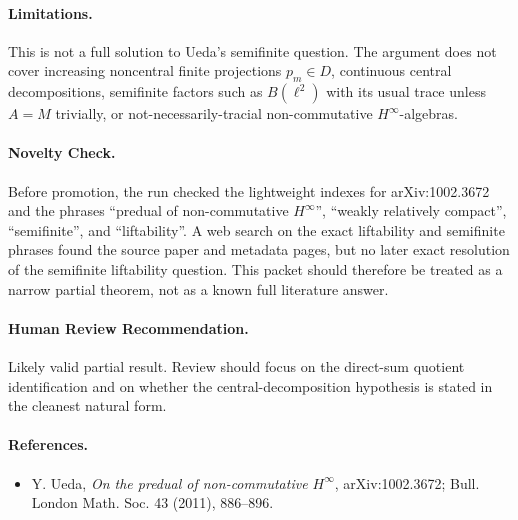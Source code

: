 \documentclass[11pt]{article}
\begin{document}
\paragraph{Limitations.}
This is not a full solution to Ueda's semifinite question.  The argument does
not cover increasing noncentral finite projections \(p_m\in D\), continuous
central decompositions, semifinite factors such as \(B(\ell^2)\) with its
usual trace unless \(A=M\) trivially, or not-necessarily-tracial
non-commutative \(H^\infty\)-algebras.

\paragraph{Novelty Check.}
Before promotion, the run checked the lightweight indexes for arXiv:1002.3672
and the phrases ``predual of non-commutative \(H^\infty\)'',
``weakly relatively compact'', ``semifinite'', and ``liftability''.  A web
search on the exact liftability and semifinite phrases found the source paper
and metadata pages, but no later exact resolution of the semifinite
liftability question.  This packet should therefore be treated as a narrow
partial theorem, not as a known full literature answer.

\paragraph{Human Review Recommendation.}
Likely valid partial result.  Review should focus on the direct-sum quotient
identification and on whether the central-decomposition hypothesis is stated
in the cleanest natural form.

\paragraph{References.}
\begin{itemize}
\item Y. Ueda, \emph{On the predual of non-commutative \(H^\infty\)},
arXiv:1002.3672; Bull. London Math. Soc. 43 (2011), 886--896.
\end{itemize}
\end{document}
